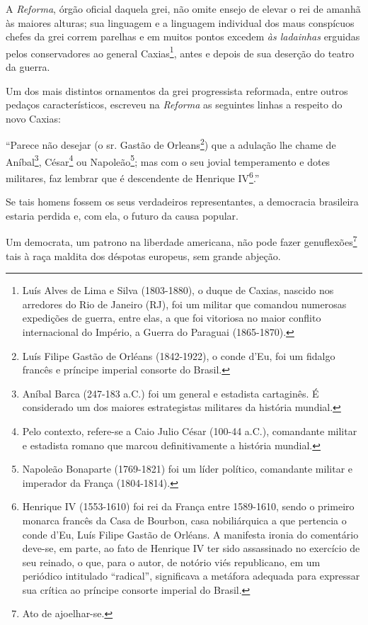 A \emph{Reforma}, órgão oficial daquela grei, não omite ensejo de elevar
o rei de amanhã às maiores alturas; sua linguagem e a linguagem
individual dos maus conspícuos chefes da grei correm parelhas e em
muitos pontos excedem \emph{às ladainhas} erguidas pelos conservadores
ao general Caxias\footnote{Luís Alves de Lima e Silva (1803-1880), o
  duque de Caxias, nascido nos arredores do Rio de Janeiro (RJ), foi um
  militar que comandou numerosas expedições de guerra, entre elas, a que
  foi vitoriosa no maior conflito internacional do Império, a Guerra do
  Paraguai (1865-1870).}, antes e depois de sua deserção do teatro da
guerra.

Um dos mais distintos ornamentos da grei progressista reformada, entre
outros pedaços característicos, escreveu na \emph{Reforma} as seguintes
linhas a respeito do novo Caxias:

``Parece não desejar (o sr. Gastão de Orleans\footnote{Luís Filipe
  Gastão de Orléans (1842-1922), o conde d'Eu, foi um fidalgo francês e
  príncipe imperial consorte do Brasil.}) que a adulação lhe chame de
Aníbal\footnote{Aníbal Barca (247-183 a.C.) foi um general e estadista
  cartaginês. É considerado um dos maiores estrategistas militares da
  história mundial.}, César\footnote{Pelo contexto, refere-se a Caio
  Julio César (100-44 a.C.), comandante militar e estadista romano que
  marcou definitivamente a história mundial.} ou Napoleão\footnote{
  Napoleão Bonaparte (1769-1821) foi um líder político, comandante
  militar e imperador da França (1804-1814).}; mas com o seu jovial
temperamento e dotes militares, faz lembrar que é descendente de
Henrique IV\footnote{Henrique IV (1553-1610) foi rei da França entre
  1589-1610, sendo o primeiro monarca francês da Casa de Bourbon, casa
  nobiliárquica a que pertencia o conde d'Eu, Luís Filipe Gastão de
  Orléans. A manifesta ironia do comentário deve-se, em parte, ao fato
  de Henrique IV ter sido assassinado no exercício de seu reinado, o
  que, para o autor, de notório viés republicano, em um periódico
  intitulado ``radical'', significava a metáfora adequada para expressar
  sua crítica ao príncipe consorte imperial do Brasil.}.''

Se tais homens fossem os seus verdadeiros representantes, a democracia
brasileira estaria perdida e, com ela, o futuro da causa popular.

Um democrata, um patrono na liberdade americana, não pode fazer
genuflexões\footnote{Ato de ajoelhar-se.} tais à raça maldita dos
déspotas europeus, sem grande abjeção.

